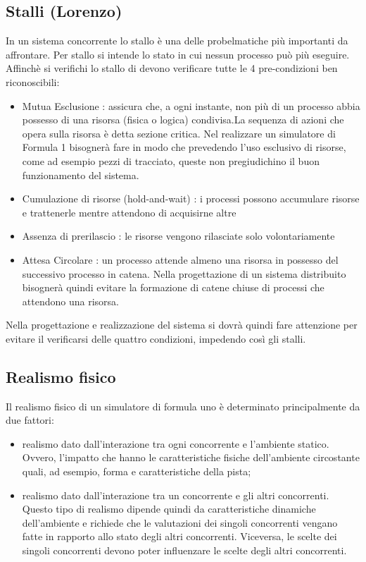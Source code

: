 \subsection{Stalli (Lorenzo)}
\label{stalli}
In un sistema concorrente lo stallo è una delle probelmatiche pi\`{u} importanti da affrontare. Per stallo si intende lo stato in cui nessun processo pu\`{o} pi\`{u} eseguire. Affinch\`{e} si verifichi lo stallo di devono verificare tutte le 4 pre-condizioni ben riconoscibili:
\begin{itemize}
\item {Mutua Esclusione :} assicura che, a ogni instante, non pi\`{u} di un processo abbia possesso di una risorsa (fisica o logica) condivisa.La sequenza di azioni che opera sulla risorsa \`{e} detta sezione critica. Nel realizzare un simulatore di Formula 1 bisogner\`{a} fare in modo che prevedendo l'uso esclusivo di risorse, come ad esempio pezzi di tracciato, queste non pregiudichino il buon funzionamento del sistema.
\item{Cumulazione di risorse (hold-and-wait) :} i processi possono accumulare risorse e trattenerle mentre attendono di acquisirne altre
\item{Assenza di prerilascio :} le risorse vengono rilasciate solo volontariamente
\item{Attesa Circolare :} un processo attende almeno una risorsa in possesso del successivo processo in catena. Nella progettazione di un sistema distribuito bisogner\`{a} quindi evitare la formazione di catene chiuse di processi che attendono una risorsa.
\end{itemize}
Nella progettazione e realizzazione del sistema si dovr\`{a} quindi fare attenzione per evitare il verificarsi delle quattro condizioni, impedendo cos\`{i} gli stalli.
\subsection{Realismo fisico}
Il realismo fisico di un simulatore di formula uno è determinato principalmente da due fattori:
\begin{itemize}
\item realismo dato dall'interazione tra ogni concorrente e l'ambiente statico. Ovvero, l'impatto che hanno
le caratteristiche fisiche dell'ambiente circostante quali, ad esempio, forma e caratteristiche della pista;
\item realismo dato dall'interazione tra un concorrente e gli altri concorrenti. Questo tipo di realismo 
dipende quindi da caratteristiche dinamiche dell'ambiente e richiede che le valutazioni dei singoli concorrenti
vengano fatte in rapporto allo stato degli altri concorrenti. Viceversa, le scelte dei singoli concorrenti
devono poter influenzare le scelte degli altri concorrenti.
\end{itemize}
